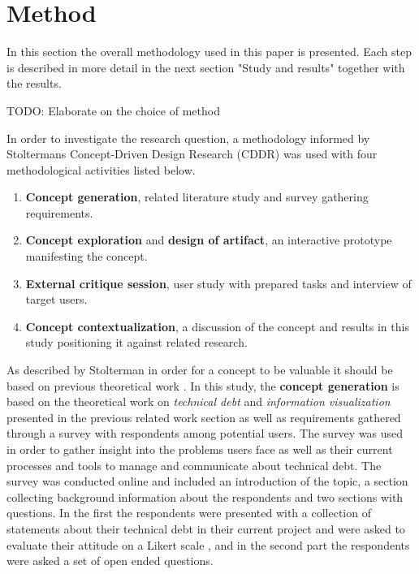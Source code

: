 

\section{Method}
In this section the overall methodology used in this paper is presented. Each step is described in more detail in the next section "Study and results" together with the results.

TODO: Elaborate on the choice of method

In order to investigate the research question, a methodology informed by Stoltermans Concept-Driven Design Research (CDDR) \cite{stolterman_concept-driven_2010} was used with four methodological activities listed below.

\smallskip
\begin{enumerate}
  \item \textbf{Concept generation}, related literature study and survey gathering requirements.
  \item \textbf{Concept exploration}  and \textbf{design of artifact}, an interactive prototype manifesting the concept.
  \item \textbf{External critique session}, user study with prepared tasks and interview of target users.
  \item \textbf{Concept contextualization}, a discussion of the concept and results in this study positioning it against related research.
\end{enumerate}
\smallskip

As described by Stolterman in order for a concept to be valuable it should be based on previous theoretical work \cite{stolterman_concept-driven_2010}.
In this study, the \textbf{concept generation} is based on the theoretical work on \textit{technical debt} and \textit{information visualization} presented in the previous related work section as well as requirements gathered through a survey with respondents among potential users.
The survey was used in order to gather insight into the problems users face as well as their current processes and tools to manage and communicate about technical debt. 
The survey was conducted online and included an introduction of the topic, a section collecting background information about the respondents and two sections with questions.
In the first the respondents were presented with a collection of statements about their technical debt in their current project and were asked to evaluate their attitude on a Likert scale \cite{wilson_questionnaires_2013}, and in the second part the respondents were asked a set of open ended questions.

